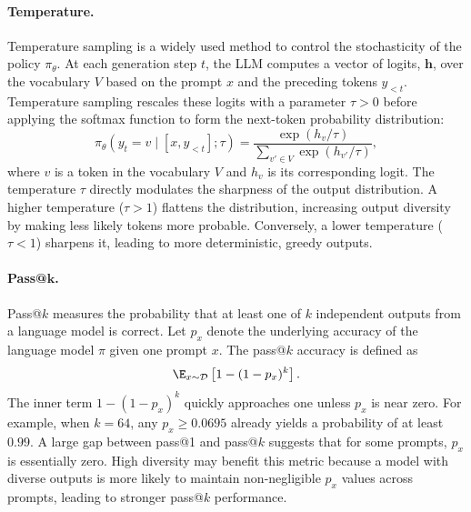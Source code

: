 \paragraph{Temperature.}
Temperature sampling \citep{ACKLEY1985147} is a widely used method to control the stochasticity of the policy $\pi_\theta$. At each generation step $t$, the LLM computes a vector of logits, $\mathbf{h}$, over the vocabulary $V$ based on the prompt $x$ and the preceding tokens $y_{<t}$. Temperature sampling rescales these logits with a parameter $\tau > 0$ before applying the softmax function to form the next-token probability distribution:
$$
\pi_\theta(y_t = v \mid [x, y_{<t}]; \tau) = \frac{\exp(h_v / \tau)}{\sum_{v' \in V} \exp(h_{v'} / \tau)},
$$
where $v$ is a token in the vocabulary $V$ and $h_v$ is its corresponding logit. The temperature $\tau$ directly modulates the sharpness of the output distribution. A higher temperature ($\tau > 1$) flattens the distribution, increasing output diversity by making less likely tokens more probable. Conversely, a lower temperature ($\tau < 1$) sharpens it, leading to more deterministic, greedy outputs. 
%

\paragraph{Pass@$\bm k$.} 
Pass@$k$ measures the probability that at least one of $k$ independent outputs from a language model is correct. 
%
Let $p_x$ denote the underlying accuracy of the language model $\pi$ given one prompt $x$. The pass@$k$ accuracy is defined as
\[
\E_{x\sim\mathcal{D}}\left[1-(1-p_x)^k\right].
\]
%
The inner term $1-(1-p_x)^k$ quickly approaches one unless $p_x$ is near zero. 
%
For example, when $k=64$, any $p_x \geq 0.0695$ already yields a probability of at least $0.99$. 
%
A large gap between pass@1 and pass@$k$ suggests that for some prompts, $p_x$ is essentially zero.
%
High diversity may benefit this metric because a model with diverse outputs is more likely to maintain non-negligible $p_x$ values across prompts, leading to stronger pass@$k$ performance.
%

